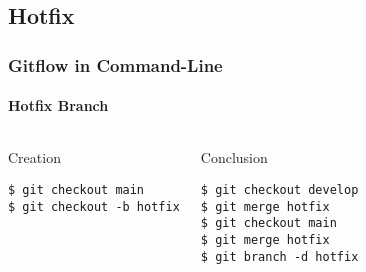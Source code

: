 \documentclass[10pt]{beamer}
\begin{document}
	\subsection{Hotfix}
	\begin{frame}[fragile]
		\frametitle{Gitflow in Command-Line}
		\framesubtitle{Hotfix Branch}
		\begin{columns}[t]
			\begin{block}{Creation}
				\small
				\begin{verbatim}
$ git checkout main
$ git checkout -b hotfix
				\end{verbatim}
			\end{block}
			\begin{block}{Conclusion}
				\small
				\begin{verbatim}
$ git checkout develop
$ git merge hotfix
$ git checkout main
$ git merge hotfix
$ git branch -d hotfix
				\end{verbatim}
			\end{block}
		\end{columns}
	\end{frame}
	\begin{frame}
	\end{frame}
\end{document}
